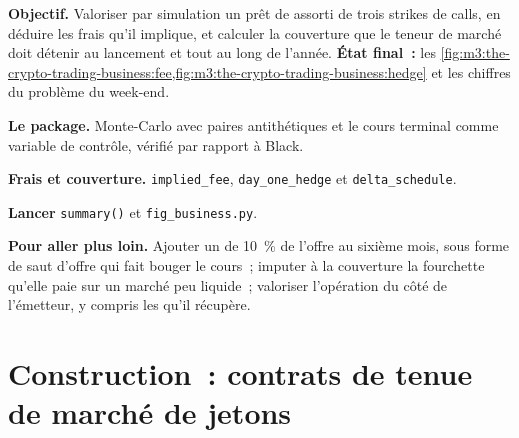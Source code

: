 \begin{tutorial}
\textbf{Objectif.} Valoriser par simulation un prêt de  assorti de trois strikes de calls, en déduire les frais qu'il implique, et calculer la couverture que le teneur de marché doit détenir au lancement
et tout au long de l'année. \textbf{État final~:} les \cref{fig:m3:the-crypto-trading-business:fee,fig:m3:the-crypto-trading-business:hedge} et les chiffres du
problème du week-end.
\begin{tutsteps}
\item \textbf{Le package.} Monte-Carlo avec paires antithétiques et le cours terminal comme variable de contrôle, vérifié par rapport à Black.
\label{lst:m3:the-crypto-trading-business:mc}
\item \textbf{Frais et couverture.} \texttt{implied\_fee}, \texttt{day\_one\_hedge} et \texttt{delta\_schedule}.
\label{lst:m3:the-crypto-trading-business:hedge}
\item \textbf{Lancer} \texttt{summary()} et \texttt{fig\_business.py}.
\end{tutsteps}
\textbf{Pour aller plus loin.} Ajouter un  de 10~\% de l'offre au sixième mois, sous forme de saut d'offre qui fait bouger le cours~; imputer à la couverture la fourchette qu'elle paie
sur un marché peu liquide~; valoriser l'opération du côté de l'émetteur, y compris les  qu'il récupère.
\end{tutorial}

\section{Construction~: contrats de tenue de marché de jetons}\label{bld:m3:the-crypto-trading-business:tokenloan}

